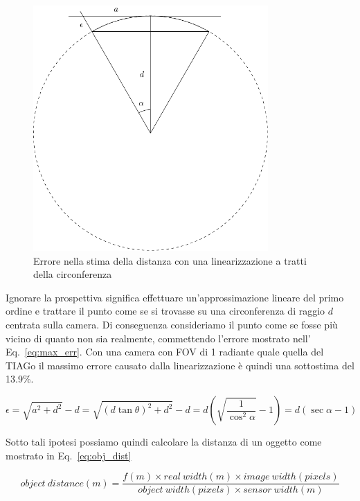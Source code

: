 \documentclass[a4paper]{article}
\begin{document}
	\begin{figure}[H]
		\centering
		\includegraphics[width=0.8\textwidth]{./img/linearization_error.pdf}
		\caption{Errore nella stima della distanza con una linearizzazione a tratti della circonferenza}
		\label{fig:error}
	\end{figure}

	Ignorare la prospettiva significa effettuare un'approssimazione lineare del
	primo ordine e trattare il punto come se si trovasse su una circonferenza
	di raggio $d$ centrata sulla camera. Di conseguenza consideriamo il punto
	come se fosse più vicino di quanto non sia realmente, commettendo l'errore
	mostrato nell' Eq.~\ref{eq:max_err}. Con una camera con FOV di 1 radiante
	quale quella del TIAGo il massimo errore causato dalla linearizzazione è
	quindi una sottostima del 13.9\%.
	
	\begin{equation}
	\epsilon = 
	\sqrt{a^2+d^2} - d =
	\sqrt{(d\tan \theta )^2+d^2}-d =
	d\left( \sqrt{\frac{1}{\cos ^2 \alpha}}-1 \right) =
	d \left( \sec \alpha -1 \right) 
	\label{eq:max_err}
	\end{equation}
	
	Sotto tali ipotesi possiamo quindi calcolare la distanza di un oggetto come
	mostrato in Eq.~\ref{eq:obj_dist}
	
	\begin{equation}\label{eq:obj_dist}
	object~distance(m) = 
	\frac{f(m) \times real~width(m) \times image~width(pixels)}
	{object~width(pixels) \times sensor~width(m)}
	\end{equation}
	
\end{document}
